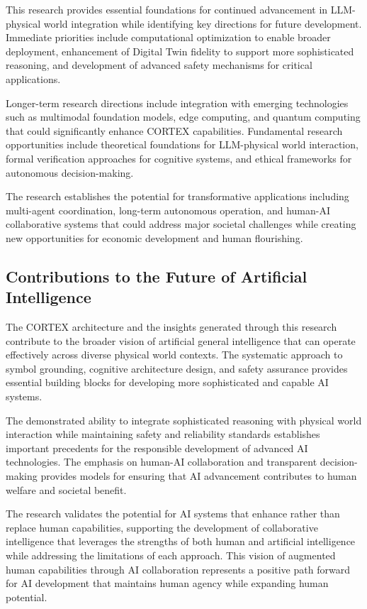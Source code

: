 This research provides essential foundations for continued advancement in LLM-physical world integration while identifying key directions for future development. Immediate priorities include computational optimization to enable broader deployment, enhancement of Digital Twin fidelity to support more sophisticated reasoning, and development of advanced safety mechanisms for critical applications.

Longer-term research directions include integration with emerging technologies such as multimodal foundation models, edge computing, and quantum computing that could significantly enhance CORTEX capabilities. Fundamental research opportunities include theoretical foundations for LLM-physical world interaction, formal verification approaches for cognitive systems, and ethical frameworks for autonomous decision-making.

The research establishes the potential for transformative applications including multi-agent coordination, long-term autonomous operation, and human-AI collaborative systems that could address major societal challenges while creating new opportunities for economic development and human flourishing.

\subsection{Contributions to the Future of Artificial Intelligence}

The CORTEX architecture and the insights generated through this research contribute to the broader vision of artificial general intelligence that can operate effectively across diverse physical world contexts. The systematic approach to symbol grounding, cognitive architecture design, and safety assurance provides essential building blocks for developing more sophisticated and capable AI systems.

The demonstrated ability to integrate sophisticated reasoning with physical world interaction while maintaining safety and reliability standards establishes important precedents for the responsible development of advanced AI technologies. The emphasis on human-AI collaboration and transparent decision-making provides models for ensuring that AI advancement contributes to human welfare and societal benefit.

The research validates the potential for AI systems that enhance rather than replace human capabilities, supporting the development of collaborative intelligence that leverages the strengths of both human and artificial intelligence while addressing the limitations of each approach. This vision of augmented human capabilities through AI collaboration represents a positive path forward for AI development that maintains human agency while expanding human potential.

